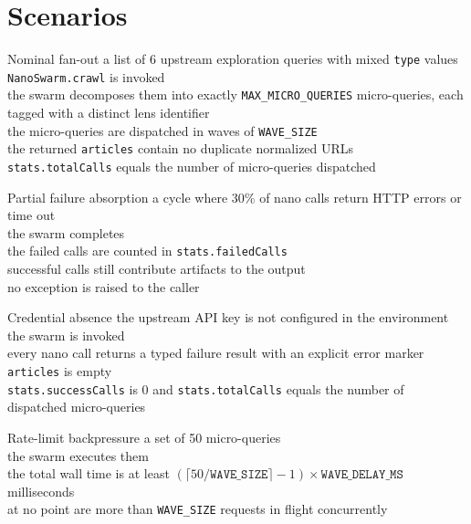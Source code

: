 \section{Scenarios}

\begin{scenario}{Nominal fan-out}
\Given a list of 6 upstream exploration queries with mixed \texttt{type} values \\
\When \texttt{NanoSwarm.crawl} is invoked \\
\Then the swarm decomposes them into exactly \texttt{MAX\_MICRO\_QUERIES} micro-queries, each tagged with a distinct lens identifier \\
\And the micro-queries are dispatched in waves of \texttt{WAVE\_SIZE} \\
\And the returned \texttt{articles} contain no duplicate normalized URLs \\
\And \texttt{stats.totalCalls} equals the number of micro-queries dispatched
\end{scenario}

\begin{scenario}{Partial failure absorption}
\Given a cycle where 30\% of nano calls return HTTP errors or time out \\
\When the swarm completes \\
\Then the failed calls are counted in \texttt{stats.failedCalls} \\
\And successful calls still contribute artifacts to the output \\
\And no exception is raised to the caller
\end{scenario}

\begin{scenario}{Credential absence}
\Given the upstream API key is not configured in the environment \\
\When the swarm is invoked \\
\Then every nano call returns a typed failure result with an explicit error marker \\
\And \texttt{articles} is empty \\
\And \texttt{stats.successCalls} is 0 and \texttt{stats.totalCalls} equals the number of dispatched micro-queries
\end{scenario}

\begin{scenario}{Rate-limit backpressure}
\Given a set of 50 micro-queries \\
\When the swarm executes them \\
\Then the total wall time is at least \((\lceil 50 / \texttt{WAVE\_SIZE} \rceil - 1) \times \texttt{WAVE\_DELAY\_MS}\) milliseconds \\
\And at no point are more than \texttt{WAVE\_SIZE} requests in flight concurrently
\end{scenario}


